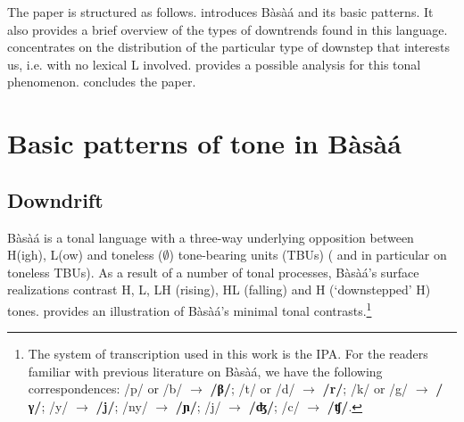 \documentclass[output=paper,newtxmath,modfonts,nonflat]{langsci/langscibook}
\begin{document}
The paper is structured as follows.  introduces Bàsà{á} and its basic  patterns. It also provides a brief overview of the types of downtrends found in this  language.  concentrates on the distribution of the particular type of downstep that interests us, i.e. with no lexical L  involved.  provides a possible analysis for this tonal phenomenon.  concludes the paper.



\section{Basic patterns of tone in Bàsà{á}}\label{sec:HamlaouiMakasso:2} 
\subsection{Downdrift}
Bàsà{á} is a tonal language with a three-way underlying opposition between H(igh), L(ow) and toneless ($\emptyset$) tone-bearing units (TBUs) (\citealt{Dimmendaal88,Hyman03,Makasso08a} and in particular \citealt{Kody93,HamlaouiEtAl14,MakassoEtAl17} on toneless TBUs). As a result of a number of tonal processes, Bàsà{á}'s surface realizations contrast H, L, LH (rising), HL (falling) and {\textdownstep}H (`downstepped' H) tones.  provides an illustration of Bàsà{á}'s minimal tonal contrasts.\footnote{The system of transcription used in this work is the IPA. For the readers familiar with previous literature on Bàsà{á}, we have the following correspondences: /p/ or /b/ $\to$ \textbf{/β/}; /t/ or /d/ $\to$ \textbf{/r/}; /k/ or /g/ $\to$ \textbf{/γ/}; /y/ $\to$ \textbf{/j/}; /ny/ $\to$ \textbf{/ɲ/}; /j/ $\to$ \textbf{/ʤ/}; /c/ $\to$ \textbf{/ʧ/}.} 


%
%
\end{document}

